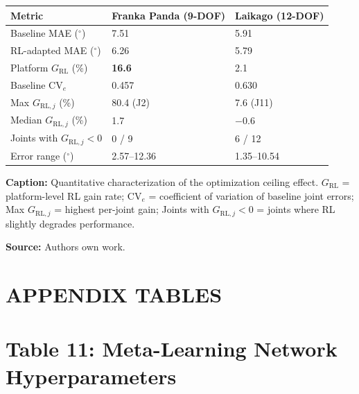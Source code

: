 \documentclass[11pt,a4paper]{article}
\begin{document}
\begin{tabular}{@{\extracolsep{\fill}}lll}
\hline
\textbf{Metric} & \textbf{Franka Panda (9-DOF)} & \textbf{Laikago (12-DOF)} \\
\hline
Baseline MAE ($^\circ$)         & 7.51             & 5.91             \\
RL-adapted MAE ($^\circ$)       & 6.26             & 5.79             \\
Platform $G_{\mathrm{RL}}$ (\%)              & \textbf{16.6}    & 2.1              \\
Baseline $\mathrm{CV}_e$                     & 0.457            & 0.630            \\
Max $G_{\mathrm{RL},j}$ (\%)           & 80.4 (J2)        & 7.6 (J11)        \\
Median $G_{\mathrm{RL},j}$ (\%)         & 1.7              & $-$0.6           \\
Joints with $G_{\mathrm{RL},j} < 0$     & 0 / 9            & 6 / 12           \\
Error range ($^\circ$)          & 2.57--12.36      & 1.35--10.54      \\
\hline
\end{tabular}

\vspace{0.2cm}
\noindent
\textbf{Caption:} Quantitative characterization of the optimization ceiling effect. $G_{\mathrm{RL}}$ = platform-level RL gain rate; $\mathrm{CV}_e$ = coefficient of variation of baseline joint errors; Max $G_{\mathrm{RL},j}$ = highest per-joint gain; Joints with $G_{\mathrm{RL},j}<0$ = joints where RL slightly degrades performance.

\vspace{0.2cm}
\noindent
\textbf{Source:} Authors own work.


\newpage
\section*{APPENDIX TABLES}


\section*{Table 11: Meta-Learning Network Hyperparameters}
\end{document}
